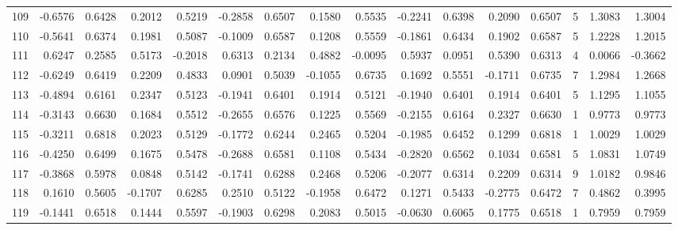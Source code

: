 \begin{tabular}{lrrrrrrrrrrrrrrr}
109 &     -0.6576 &  0.6428 &  0.2012 &  0.5219 & -0.2858 &  0.6507 &  0.1580 &  0.5535 & -0.2241 &  0.6398 &   0.2090 &     0.6507 &      5 &                    1.3083 &                     1.3004 \\
110 &     -0.5641 &  0.6374 &  0.1981 &  0.5087 & -0.1009 &  0.6587 &  0.1208 &  0.5559 & -0.1861 &  0.6434 &   0.1902 &     0.6587 &      5 &                    1.2228 &                     1.2015 \\
111 &      0.6247 &  0.2585 &  0.5173 & -0.2018 &  0.6313 &  0.2134 &  0.4882 & -0.0095 &  0.5937 &  0.0951 &   0.5390 &     0.6313 &      4 &                    0.0066 &                    -0.3662 \\
112 &     -0.6249 &  0.6419 &  0.2209 &  0.4833 &  0.0901 &  0.5039 & -0.1055 &  0.6735 &  0.1692 &  0.5551 &  -0.1711 &     0.6735 &      7 &                    1.2984 &                     1.2668 \\
113 &     -0.4894 &  0.6161 &  0.2347 &  0.5123 & -0.1941 &  0.6401 &  0.1914 &  0.5121 & -0.1940 &  0.6401 &   0.1914 &     0.6401 &      5 &                    1.1295 &                     1.1055 \\
114 &     -0.3143 &  0.6630 &  0.1684 &  0.5512 & -0.2655 &  0.6576 &  0.1225 &  0.5569 & -0.2155 &  0.6164 &   0.2327 &     0.6630 &      1 &                    0.9773 &                     0.9773 \\
115 &     -0.3211 &  0.6818 &  0.2023 &  0.5129 & -0.1772 &  0.6244 &  0.2465 &  0.5204 & -0.1985 &  0.6452 &   0.1299 &     0.6818 &      1 &                    1.0029 &                     1.0029 \\
116 &     -0.4250 &  0.6499 &  0.1675 &  0.5478 & -0.2688 &  0.6581 &  0.1108 &  0.5434 & -0.2820 &  0.6562 &   0.1034 &     0.6581 &      5 &                    1.0831 &                     1.0749 \\
117 &     -0.3868 &  0.5978 &  0.0848 &  0.5142 & -0.1741 &  0.6288 &  0.2468 &  0.5206 & -0.2077 &  0.6314 &   0.2209 &     0.6314 &      9 &                    1.0182 &                     0.9846 \\
118 &      0.1610 &  0.5605 & -0.1707 &  0.6285 &  0.2510 &  0.5122 & -0.1958 &  0.6472 &  0.1271 &  0.5433 &  -0.2775 &     0.6472 &      7 &                    0.4862 &                     0.3995 \\
119 &     -0.1441 &  0.6518 &  0.1444 &  0.5597 & -0.1903 &  0.6298 &  0.2083 &  0.5015 & -0.0630 &  0.6065 &   0.1775 &     0.6518 &      1 &                    0.7959 &                     0.7959 \\

\end{tabular}
